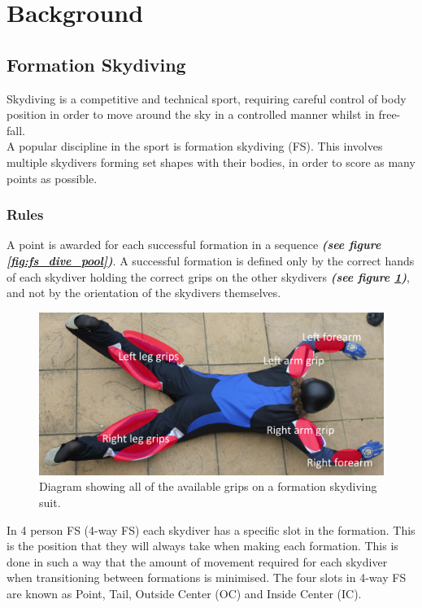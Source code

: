 \documentclass[a4paper, 12pt]{article}
\begin{document}
\section{Background}
	\subsection{Formation Skydiving}
Skydiving is a competitive and technical sport, requiring careful control of body position in order to move around the sky in a controlled manner whilst in free-fall.\\
A popular discipline in the sport is formation skydiving (FS). This involves multiple skydivers forming set shapes with their bodies, in order to score as many points as possible.
		\subsubsection{Rules}
		A point is awarded for each successful formation in a sequence \textbf{\emph{(see figure \ref{fig:fs_dive_pool})}}. A successful formation is defined only by the correct hands of each skydiver holding the correct grips on the other skydivers \textbf{\emph{(see figure \ref{fig:grips})}}, and not by the orientation of the skydivers themselves.
%
\begin{figure}[H]
	\centering
	\includegraphics[width=0.9\linewidth]{grips.png}
	\caption{Diagram showing all of the available grips on a formation skydiving suit.}
	\label{fig:grips}
\end{figure}
%
\noindent In 4 person FS (4-way FS) each skydiver has a specific slot in the formation. This is the position that they will always take when making each formation. This is done in such a way that the amount of movement required for each skydiver when transitioning between formations is minimised. The four slots in 4-way FS are known as Point, Tail, Outside Center (OC) and Inside Center (IC). 
%
\end{document}
